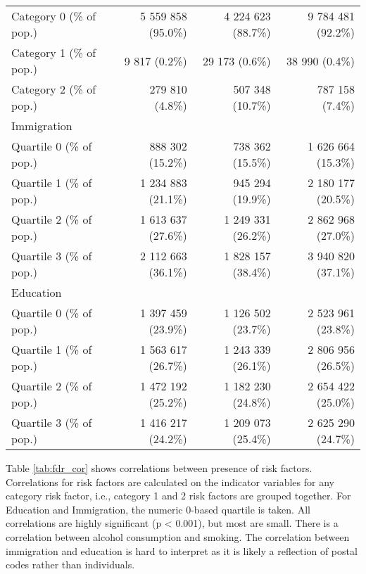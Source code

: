 \documentclass{article}
\begin{document}
\begin{table}
\begin{longtable}{l|rrr}
\midrule
\hspace*{25px} Category  0 (\% of pop.) & 5 559 858 (95.0\%) & 4 224 623 (88.7\%) & 9 784 481 (92.2\%) \\ 
\hspace*{25px} Category  1 (\% of pop.) & 9 817 (0.2\%) & 29 173 (0.6\%) & 38 990 (0.4\%) \\ 
\hspace*{25px} Category  2 (\% of pop.) & 279 810 (4.8\%) & 507 348 (10.7\%) & 787 158 (7.4\%) \\ 
\midrule
\multicolumn{4}{l}{Immigration} \\ 
\midrule
\hspace*{25px} Quartile  0 (\% of pop.) & 888 302 (15.2\%) & 738 362 (15.5\%) & 1 626 664 (15.3\%) \\ 
\hspace*{25px} Quartile  1 (\% of pop.) & 1 234 883 (21.1\%) & 945 294 (19.9\%) & 2 180 177 (20.5\%) \\ 
\hspace*{25px} Quartile  2 (\% of pop.) & 1 613 637 (27.6\%) & 1 249 331 (26.2\%) & 2 862 968 (27.0\%) \\ 
\hspace*{25px} Quartile  3 (\% of pop.) & 2 112 663 (36.1\%) & 1 828 157 (38.4\%) & 3 940 820 (37.1\%) \\ 
\midrule
\multicolumn{4}{l}{Education} \\ 
\midrule
\hspace*{25px} Quartile  0 (\% of pop.) & 1 397 459 (23.9\%) & 1 126 502 (23.7\%) & 2 523 961 (23.8\%) \\ 
\hspace*{25px} Quartile  1 (\% of pop.) & 1 563 617 (26.7\%) & 1 243 339 (26.1\%) & 2 806 956 (26.5\%) \\ 
\hspace*{25px} Quartile  2 (\% of pop.) & 1 472 192 (25.2\%) & 1 182 230 (24.8\%) & 2 654 422 (25.0\%) \\ 
\hspace*{25px} Quartile  3 (\% of pop.) & 1 416 217 (24.2\%) & 1 209 073 (25.4\%) & 2 625 290 (24.7\%) \\ 
\bottomrule
\end{longtable}
\end{table}

Table \ref{tab:fdr_cor} shows correlations between presence of risk
factors. Correlations for risk factors are calculated on the indicator
variables for any category risk factor, i.e., category 1 and 2 risk
factors are grouped together. For Education and Immigration, the numeric
0-based quartile is taken. All correlations are highly significant (p
\textless{} 0.001), but most are small. There is a correlation between
alcohol consumption and smoking. The correlation between immigration and
education is hard to interpret as it is likely a reflection of postal
codes rather than individuals.
\end{document}
